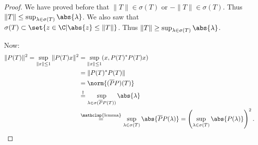 \documentclass{article}
\begin{document}
\begin{proof}
    We have proved before that $\|T\| \in \sigma(T)$ or $-\|T\| \in \sigma(T)$.
    Thus $\|T\| \leq \sup_{\lambda \in \sigma(T)} \abs{\lambda}$.
    We also saw that $\sigma(T) \subset \set{z \in \C | \abs{z} \leq \|T\|}$.
    Thus $\|T\| \geq \sup_{\lambda \in \sigma(T)} \abs{\lambda}$.

    Now:
    \begin{align*}
        \|P(T)\|^2 = \sup_{\|x\| \leq 1} \|P(T) x\|^2 &= \sup_{\|x\| \leq 1} (x, P(T)^* P(T) x) \\
                                                               &= \|P(T)^* P(T)\| \\
                                                               &= \norm{(\overline{P}P) (T)} \\
                                                               &\overset{\dagger}{=} \sup_{\lambda \in \sigma(\overline{P}P(T))} \abs{\lambda} \\
                                                               &\overset{\mathclap{\text{lemma}}}{=} \sup_{\lambda \in \sigma(T)} \abs{\overline{P} P (\lambda)} = \left(\sup_{\lambda \in \sigma(T)} \abs{P(\lambda)}\right)^2. \qedhere
    \end{align*}
\end{proof}
\end{document}
